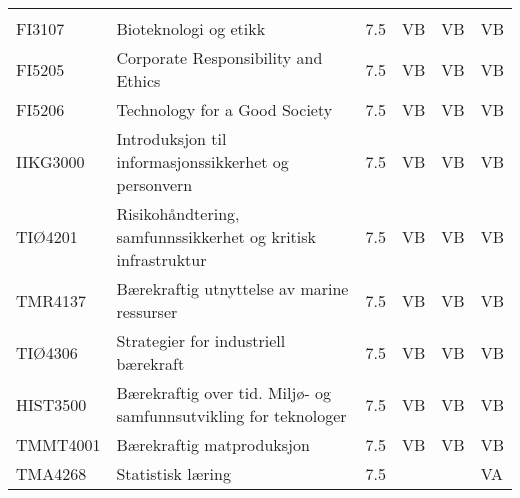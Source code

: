 \documentclass{article}
\begin{document}
\begin{table}[!ht]
\begin{tabular}{llllll}
             &                                                                    &     &     &     &    \\
    FI3107   & Bioteknologi   og etikk                                            & 7.5 & VB  & VB  & VB \\
    FI5205   & Corporate   Responsibility and Ethics                              & 7.5 & VB  & VB  & VB \\
    FI5206   & Technology   for a Good Society                                    & 7.5 & VB  & VB  & VB \\
    IIKG3000 & Introduksjon   til informasjonssikkerhet og personvern             & 7.5 & VB  & VB  & VB \\
    TIØ4201  & Risikohåndtering,   samfunnssikkerhet og kritisk infrastruktur     & 7.5 & VB  & VB  & VB \\
    TMR4137  & Bærekraftig   utnyttelse av marine ressurser                       & 7.5 & VB  & VB  & VB \\
    TIØ4306  & Strategier   for industriell bærekraft                             & 7.5 & VB  & VB  & VB \\
    HIST3500 & Bærekraftig   over tid. Miljø- og samfunnsutvikling for teknologer & 7.5 & VB  & VB  & VB \\
    TMMT4001 & Bærekraftig   matproduksjon                                        & 7.5 & VB  & VB  & VB \\
    TMA4268  & Statistisk læring                                                  & 7.5 &     &     & VA \\
    \bottomrule
  \end{tabular}
\end{table}



\end{document}
